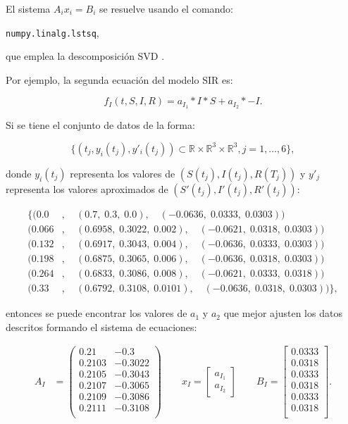 El sistema $A_ix_i = B_i$ se resuelve usando el comando:

\texttt{numpy.linalg.lstsq},

que emplea la descomposición SVD \cite{numpy-lstsq}.

Por ejemplo, la segunda ecuación del modelo SIR es:

$$f_I (t,S,I,R) = a_{I_1} * I * S + a_{I_2} * -I.$$

Si se tiene el conjunto de datos de la forma:

$$\{(t_j, y_i(t_j), y'_i(t_j)) \subset \mathbb{R} \times \mathbb{R}^{3} \times \mathbb{R}^3, j = 1, \dots, 6\},$$

donde $y_i(t_j)$ representa los valores de $(S(t_j), I(t_j), R(T_j))$ y $y'_j$ representa los valores aproximados de $(S'(t_j), I'(t_j), R'(t_j))$:

\begin{align*}
    \{  (0.0 & , \quad (0.7, \; 0.3, \; 0.0), \quad (-0.0636, \; 0.0333, \; 0.0303))              \\
    (0.066   & , \quad (0.6958, \; 0.3022, \; 0.002), \quad (-0.0621, \; 0.0318, \; 0.0303))      \\
    (0.132   & , \quad (0.6917, \; 0.3043, \; 0.004), \quad (-0.0636, \; 0.0333, \; 0.0303))      \\
    (0.198   & , \quad (0.6875, \; 0.3065, \; 0.006), \quad (-0.0636, \; 0.0318, \; 0.0303))      \\
    (0.264   & , \quad (0.6833, \; 0.3086, \; 0.008), \quad (-0.0621, \; 0.0333, \; 0.0318))      \\
    (0.33    & , \quad (0.6792, \; 0.3108, \; 0.0101), \quad (-0.0636, \; 0.0318, \; 0.0303)) \},
\end{align*}

entonces se puede encontrar los valores de $a_1$ y $a_2$ que mejor ajusten los datos descritos formando el sistema de ecuaciones:

\begin{align*}
    A_I & = \begin{pmatrix}
        0.21   & -0.3    \\
        0.2103 & -0.3022 \\
        0.2105 & -0.3043 \\
        0.2107 & -0.3065 \\
        0.2109 & -0.3086 \\
        0.2111 & -0.3108 \\
    \end{pmatrix}
    \qquad
    x_I = \begin{bmatrix}
        a_{I_1} \\
        a_{I_2}
    \end{bmatrix}
    \qquad
    B_I = \begin{bmatrix}
        0.0333 \\
        0.0318 \\
        0.0333 \\
        0.0318 \\
        0.0333 \\
        0.0318 \\
    \end{bmatrix}.
\end{align*}

